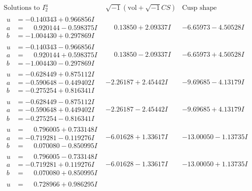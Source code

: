\documentclass[1p]{elsarticle_modified}
\theoremstyle{definition}
\newcommand{\I}{\sqrt{-1}}
\begin{document}
$$\begin{array}{c|c|c}  
\text{Solutions to }I^u_{2}& \I (\text{vol} + \sqrt{-1}CS) & \text{Cusp shape}\\
 \hline 
\begin{aligned}
u &= -0.140343 + 0.966856 I \\
a &= \phantom{-}0.920144 - 0.598375 I \\
b &= -1.004430 + 0.297869 I\end{aligned}
 & \phantom{-}0.13850 + 2.09337 I & -6.65973 - 4.50528 I \\ \hline\begin{aligned}
u &= -0.140343 - 0.966856 I \\
a &= \phantom{-}0.920144 + 0.598375 I \\
b &= -1.004430 - 0.297869 I\end{aligned}
 & \phantom{-}0.13850 - 2.09337 I & -6.65973 + 4.50528 I \\ \hline\begin{aligned}
u &= -0.628449 + 0.875112 I \\
a &= -0.590648 - 0.449402 I \\
b &= -0.275254 + 0.816341 I\end{aligned}
 & -2.26187 + 2.45442 I & -9.69685 - 4.13179 I \\ \hline\begin{aligned}
u &= -0.628449 - 0.875112 I \\
a &= -0.590648 + 0.449402 I \\
b &= -0.275254 - 0.816341 I\end{aligned}
 & -2.26187 - 2.45442 I & -9.69685 + 4.13179 I \\ \hline\begin{aligned}
u &= \phantom{-}0.796005 + 0.733148 I \\
a &= -0.719281 - 0.119276 I \\
b &= \phantom{-}0.070080 - 0.850995 I\end{aligned}
 & -6.01628 + 1.33617 I & -13.00050 - 1.13735 I \\ \hline\begin{aligned}
u &= \phantom{-}0.796005 - 0.733148 I \\
a &= -0.719281 + 0.119276 I \\
b &= \phantom{-}0.070080 + 0.850995 I\end{aligned}
 & -6.01628 - 1.33617 I & -13.00050 + 1.13735 I \\ \hline\begin{aligned}
u &= \phantom{-}0.728966 + 0.986295 I \\

\end{aligned}
\end{array}$$
\end{document}
